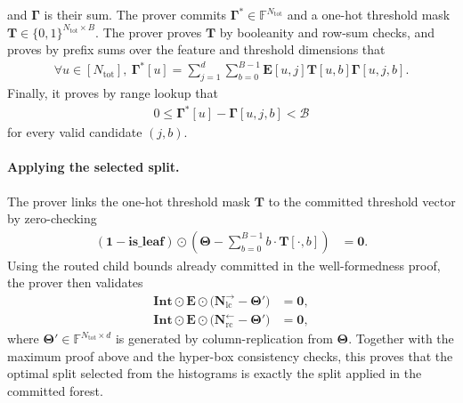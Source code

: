 and $\boldsymbol{\Gamma}$ is their sum.
The prover commits $\boldsymbol{\Gamma}^{*}\in
\mathbb{F}^{N_{\mathrm{tot}}}$ and a one-hot threshold mask
$\mathbf{T}\in \{0, 1\}^{N_{\mathrm{tot}}\times B}$.
The prover proves $\mathbf{T}$ by booleanity and row-sum checks, and proves
by prefix sums over the feature and threshold dimensions that
\begin{align}
    \forall u\in [N_{\mathrm{tot}}],\ 
    \boldsymbol{\Gamma}^{*}[u]
    =
    \sum_{j=1}^{d}\sum_{b=0}^{B-1}
    \mathbf{E}[u,j]\mathbf{T}[u,b]\boldsymbol{\Gamma}[u,j,b].
\end{align}
Finally, it proves by range lookup that
\begin{align}
    0\leq
    \boldsymbol{\Gamma}^{*}[u]
    -
    \boldsymbol{\Gamma}[u,j,b]
    <\mathcal{B}
\end{align}
for every valid candidate $(j,b)$.

\paragraph{Applying the selected split.}
The prover links the one-hot threshold mask $\mathbf{T}$ to the committed threshold vector 
by zero-checking
\begin{align}
    (\mathbf{1}-\mathbf{is\_leaf})\odot
    \left(
    \boldsymbol{\Theta}
    -
    \sum_{b=0}^{B-1} b\cdot\mathbf{T}[\cdot,b]
    \right)
    &=\mathbf{0}.
\end{align}
Using the routed child bounds already committed in the well-formedness proof,
the prover then validates
\begin{align}
    \mathbf{Int}\odot\mathbf{E}\odot
    \bigl(\mathbf{N}^{\rightarrow}_{\mathrm{lc}}-\boldsymbol{\Theta}'\bigr)
    &=\mathbf{0},\\
    \mathbf{Int}\odot\mathbf{E}\odot
    \bigl(\mathbf{N}^{\leftarrow}_{\mathrm{rc}}-\boldsymbol{\Theta}'\bigr)
    &=\mathbf{0},
\end{align}
where $\boldsymbol{\Theta}'\in\mathbb{F}^{N_{\mathrm{tot}}\times d}$ is
generated by column-replication from $\boldsymbol{\Theta}$.
Together with the maximum proof above and the hyper-box consistency checks,
this proves that the optimal split selected from the histograms is exactly the
split applied in the committed forest.
